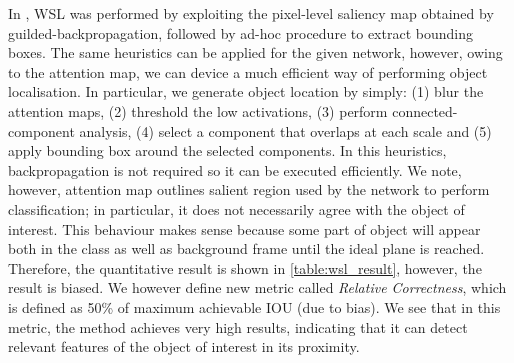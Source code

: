 \documentclass{article}
\begin{document}
In \cite{baumgartner2016real}, WSL was performed by exploiting the pixel-level saliency map obtained by guilded-backpropagation, followed by ad-hoc procedure to extract bounding boxes. The same heuristics can be applied for the given network, however, owing to the attention map, we can device a much efficient way of performing object localisation. In particular, we generate object location by simply: (1) blur the attention maps, (2) threshold the low activations, (3) perform connected-component analysis, (4) select a component that overlaps at each scale and (5) apply bounding box around the selected components. In this heuristics, backpropagation is not required so it can be executed efficiently. We note, however, attention map outlines salient region used by the network to perform classification; in particular, it does not necessarily agree with the object of interest. This behaviour makes sense because some part of object will appear both in the class as well as background frame until the ideal plane is reached. Therefore, the quantitative result is shown in \ref{table:wsl_result}, however, the result is biased. We however define new metric called \emph{Relative Correctness}, which is defined as 50\% of maximum achievable IOU (due to bias). We see that in this metric, the method achieves very high results, indicating that it can detect relevant features of the object of interest in its proximity. 

\begin{table}[htb]
\centering
\caption{WSL performance for the proposed strategy with AG-Sononet-FT-16. Correctness (Cor.) is defined as $IOU > 0.5$. Relative Correctness (Rel.) is defined as $IOU > 0.5\times \max(IOU_{class})$. }
\scalebox{1}{
\begin{tabular}{llll}%
\toprule{}   &  IOU Mean (Std) &  Cor. (\%)  &  Rel. (\%) \\ \midrule
Brain (Cb.)  &   0.69 (0.11) &  0.96 & 0.96  \\
Brain (Tv.)  &   0.68 (0.12) &  0.96 & 0.96  \\
Profile      &   0.31 (0.08) &  0.00 & 0.80  \\
Lips         &   0.42 (0.18) &  0.36 & 0.60  \\
Abdominal    &   0.71 (0.10) &  0.96 & 0.96  \\
Kidneys      &   0.73 (0.13) &  0.92 & 0.98  \\
Femur        &   0.31 (0.11) &  0.02 & 0.58  \\
Spine (Cor.) &   0.53 (0.13) &  0.56 & 0.76  \\
Spine (Sag.) &   0.53 (0.11) &  0.54 & 0.94  \\
4CH          &   0.61 (0.14) &  0.76 & 0.86  \\
3VV          &   0.42 (0.14) &  0.34 & 0.62  \\
RVOT         &   0.56 (0.15) &  0.70 & 0.76  \\
LVOT         &   0.54 (0.15) &  0.62 & 0.80  \\
\bottomrule
\end{tabular}}
\label{table:wsl_result}
\end{table}
\end{document}
